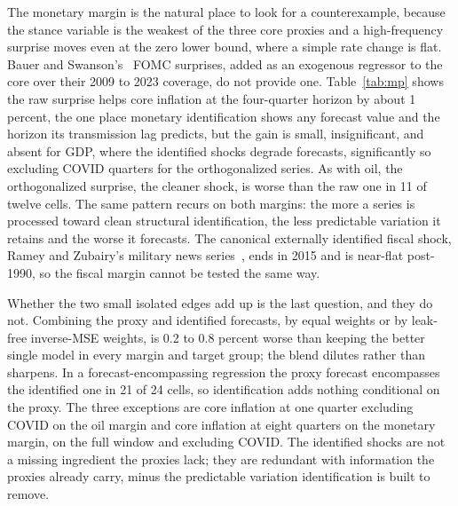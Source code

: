 \documentclass[conference]{IEEEtran}
\begin{document}
The monetary margin is the natural place to look for a counterexample, because the stance variable is the weakest of the three core proxies and a high-frequency surprise moves even at the zero lower bound, where a simple rate change is flat. Bauer and Swanson's~\cite{bauerswanson2023} FOMC surprises, added as an exogenous regressor to the core over their 2009 to 2023 coverage, do not provide one. Table~\ref{tab:mp} shows the raw surprise helps core inflation at the four-quarter horizon by about 1 percent, the one place monetary identification shows any forecast value and the horizon its transmission lag predicts, but the gain is small, insignificant, and absent for GDP, where the identified shocks degrade forecasts, significantly so excluding COVID quarters for the orthogonalized series. As with oil, the orthogonalized surprise, the cleaner shock, is worse than the raw one in 11 of twelve cells. The same pattern recurs on both margins: the more a series is processed toward clean structural identification, the less predictable variation it retains and the worse it forecasts. The canonical externally identified fiscal shock, Ramey and Zubairy's military news series~\cite{ramey2011}, ends in 2015 and is near-flat post-1990, so the fiscal margin cannot be tested the same way.

Whether the two small isolated edges add up is the last question, and they do not. Combining the proxy and identified forecasts, by equal weights or by leak-free inverse-MSE weights, is 0.2 to 0.8 percent worse than keeping the better single model in every margin and target group; the blend dilutes rather than sharpens. In a forecast-encompassing regression the proxy forecast encompasses the identified one in 21 of 24 cells, so identification adds nothing conditional on the proxy. The three exceptions are core inflation at one quarter excluding COVID on the oil margin and core inflation at eight quarters on the monetary margin, on the full window and excluding COVID. The identified shocks are not a missing ingredient the proxies lack; they are redundant with information the proxies already carry, minus the predictable variation identification is built to remove.
\end{document}
